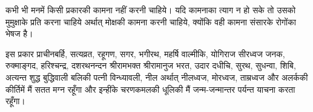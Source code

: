 \begin{sloppypar}\justifying{}
कभी भी मनमें किसी प्रकारकी कामना नहीं करनी चाहिये। यदि कामनाका त्याग न हो सके तो उसको मुमुक्षाके प्रति करना चाहिये अर्थात् मोक्षकी कामना करनी चाहिये, क्योंकि वही कामना संसारके रोगोंका भेषज है।
\end{sloppypar}
\begin{sloppypar}\justifying{}
इस प्रकार प्राचीनबर्हि, सत्यव्रत, रहूगण, सगर, भगीरथ, महर्षि वाल्मीकि, योगिराज सीरध्वज जनक, रुक्माङ्गद, हरिश्चन्द्र, दशरथनन्दन श्रीरामभक्त श्रीरामानुज भरत, उदार दधीचि, सुरथ, सुधन्वा, शिबि, अत्यन्त शुद्ध बुद्धिवाली बलिकी पत्नी विन्ध्यावली, नील अर्थात् नीलध्वज, मोरध्वज, ताम्रध्वज और अलर्ककी कीर्तिमें मैं सतत मग्न रहूँगा और इन्हींके चरण\-कमलकी धूलिकी मैं जन्म-जन्मान्तर पर्यन्त याचना करता रहूँगा।
\end{sloppypar}


